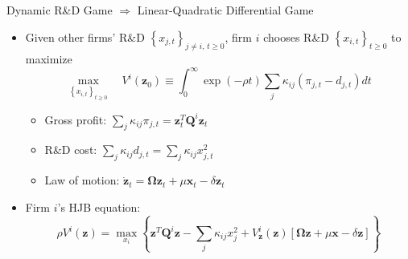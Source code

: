 \documentclass[
  10pt,
  aspectratio=169,   %
]{beamer}
\theoremstyle{plain}
\begin{document}
\begin{frame}{Dynamic R\&D Game $\Longrightarrow$ Linear-Quadratic Differential Game}
  \label{dynamic_game}
  \begin{itemize}
    \item Given other firms' R\&D $\left\{ x_{j,t}\right\}_{j\neq i,\,t\geq0}$, firm $i$ chooses R\&D $\left\{ x_{i,t}\right\}_{t\geq0}$ to maximize
          \[
            \max_{\left\{ x_{i,t}\right\}_{t\geq0}}\quad V^{i}\left(\bm{z}_{0}\right)\equiv\int_{0}^{\infty}\exp\left(-\rho t\right) \sum_{j}\kappa_{ij}\left(\pi_{j,t}-d_{j,t}\right) dt
          \]
          \begin{itemize}
            \item Gross profit: $\sum_{j}\kappa_{ij}\pi_{j,t}=\bm{z}_{t}^{T}\bm{Q}^{i}\bm{z}_{t}$ \hyperlink{Q}{} \medskip{}
            \item R\&D cost: $\sum_{j} \kappa_{ij} d_{j,t}= \sum_{j} \kappa_{ij} x_{j,t}^2$ \medskip{}
            \item Law of motion: $\dot{\bm{z}}_{t}=\bm{\Omega}\bm{z}_{t}+\mu\bm{x}_{t}-\delta\bm{z}_{t}$
          \end{itemize}
          \medskip{} \pause
    \item Firm $i$'s HJB equation:
          \[
            \rho V^{i}\left(\bm{z}\right)=\max_{x_{i}}\left\{ \bm{z}^{T}\bm{Q}^{i}\bm{z}-\sum_{j}\kappa_{ij}x_{j}^{2}+V_{\bm{z}}^{i}\left(\bm{z}\right)\left[\bm{\Omega}\bm{z}+\mu\bm{x} - \delta\bm{z} \right]\right\}
          \]
  \end{itemize}
\end{frame}
\end{document}
